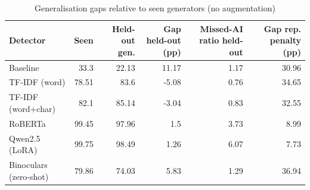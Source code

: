 \begin{table}[!t]
\centering
\caption{Generalisation gaps relative to seen generators (no augmentation)}
\label{tab:generalisation_gaps}
\footnotesize
\begin{tabular}{lrrrrr}
\toprule
\textbf{Detector} & \textbf{Seen} & \textbf{Held-out gen.} & \textbf{Gap held-out (pp)} & \textbf{Missed-AI ratio held-out} & \textbf{Gap rep. penalty (pp)} \\
\midrule
Baseline & 33.3 & 22.13 & 11.17 & 1.17 & 30.96 \\
TF-IDF (word) & 78.51 & 83.6 & -5.08 & 0.76 & 34.65 \\
TF-IDF (word+char) & 82.1 & 85.14 & -3.04 & 0.83 & 32.55 \\
RoBERTa & 99.45 & 97.96 & 1.5 & 3.73 & 8.99 \\
Qwen2.5 (LoRA) & 99.75 & 98.49 & 1.26 & 6.07 & 7.73 \\
Binoculars (zero-shot) & 79.86 & 74.03 & 5.83 & 1.29 & 36.94 \\
\bottomrule
\end{tabular}
\end{table}
